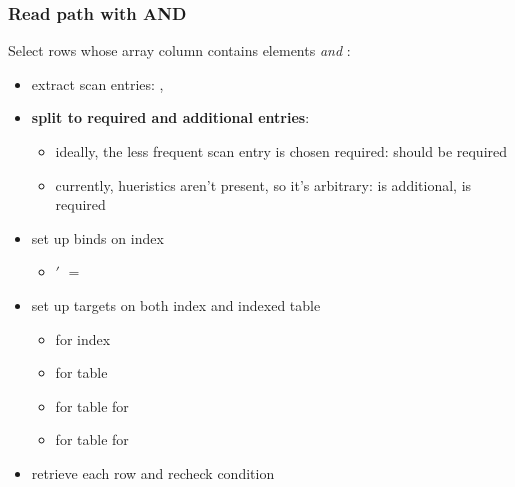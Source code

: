 \begin{frame}
  \frametitle{Read path with AND}
  Select rows whose array column contains elements  \emph{and}
  :

  \pause

  \begin{itemize}
    \item extract scan entries: , 
      \pause
    \item \textbf{split to required and additional entries}:
      \pause
      \begin{itemize}
        \item ideally, the less frequent scan entry is chosen required:
           should be required
          \pause
        \item currently, hueristics aren't present, so it's arbitrary:
           is additional,  is required
      \end{itemize}
      \pause
    \item set up binds on index
      \begin{itemize}
        \item {}$'$ $=$ 
      \end{itemize}
      \pause
    \item set up targets on both index and indexed table
      \begin{itemize}
        \item {} for index
        \item {} for table
        \item {} for table for 
        \item {} for table for 
      \end{itemize}
      \pause
    \item retrieve each row and recheck condition
  \end{itemize}
\end{frame}


